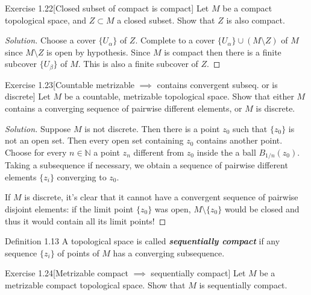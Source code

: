 \begin{thing4}{Exercise 1.22}[Closed subset of compact is compact]\leavevmode
	Let $M$ be a compact topological space, and $Z \subset M$ a closed subset. Show that $Z$ is also compact.
\end{thing4}

\begin{proof}[Solution]\leavevmode
Choose a cover $\{U_\alpha\}$ of $Z$. Complete to a cover $\{U_\alpha\}\cup (M\setminus Z)$ of $M$ since $M\setminus Z$ is open by hypothesis. Since $M$ is compact then there is a finite subcover $\{U_\beta\}$ of $M$. This is also a finite subcover of $Z$.
\end{proof}

\begin{thing4}{Exercise 1.23}[Countable metrizable $\implies $ contains convergent subseq. or is discrete]\label{exer:1.23}\leavevmode
	Let $M$ be a countable, metrizable topological space. Show that either $M$ contains a converging sequence of pairwise different elements, or $M$ is discrete.
\end{thing4}

\begin{proof}[Solution]\leavevmode
Suppose $M$ is not discrete. Then there is a point $z_0$ such that $\{z_0\}$ is not an open set. Then every open set containing $z_0$ contains another point. Choose for every $n \in \mathbb{N}$ a point $z_n$ different from $z_0$ inside the a ball $B_{1/n}(z_0)$. Taking a subsequence if necessary, we obtain a sequence of pairwise different elements $\{z_i\}$ converging to $z_0$.

If $M$ is discrete, it's clear that it cannot have a convergent sequence of pairwise disjoint elements: if the limit point $\{z_0\}$ was open,  $M\setminus \{z_0\}$ would be closed and thus it would contain all its limit points!
\end{proof}

\begin{thing3}{Definition 1.13}\leavevmode
	A topological space is called \textit{\textbf{sequentially compact}} if any sequence $\{z_i\}$ of points of $M$ has a converging subsequence.
\end{thing3}

\begin{thing4}{Exercise 1.24}[Metrizable compact $\implies $ sequentially compact]\label{exer:1.24}\leavevmode
	Let $M$ be a metrizable compact topological space. Show that $M$ is sequentially compact.
\end{thing4}

